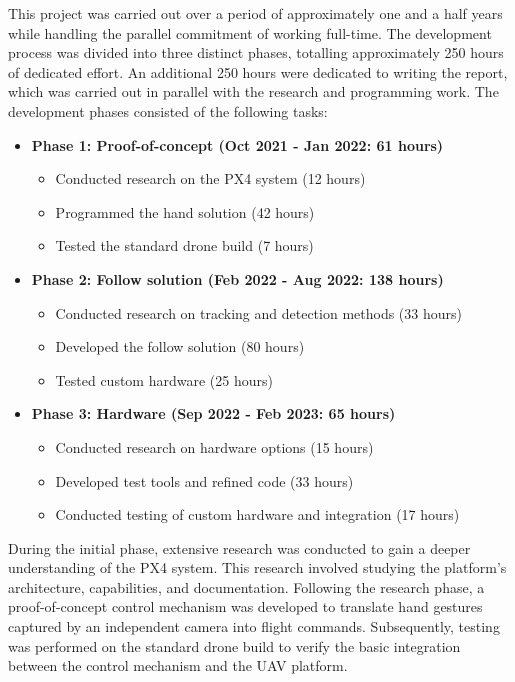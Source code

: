 This project was carried out over a period of approximately one and a half years while handling the parallel commitment of working full-time. The development process was divided into three distinct phases, totalling approximately 250 hours of dedicated effort. An additional 250 hours were dedicated to writing the report, which was carried out in parallel with the research and programming work. The development phases consisted of the following tasks:

\begin{itemize}
\item \textbf{Phase 1: Proof-of-concept (Oct 2021 - Jan 2022: 61 hours)}
\begin{itemize}
\item Conducted research on the PX4 system (12 hours)
\item Programmed the hand solution (42 hours)
\item Tested the standard drone build (7 hours)
\end{itemize}

\item \textbf{Phase 2: Follow solution (Feb 2022 - Aug 2022: 138 hours)}
\begin{itemize}
    \item Conducted research on tracking and detection methods (33 hours)
    \item Developed the follow solution (80 hours)
    \item Tested custom hardware (25 hours)
\end{itemize}

\item \textbf{Phase 3: Hardware (Sep 2022 - Feb 2023: 65 hours)}
\begin{itemize}
    \item Conducted research on hardware options (15 hours)
    \item Developed test tools and refined code (33 hours)
    \item Conducted testing of custom hardware and integration (17 hours)
\end{itemize}
\end{itemize}

During the initial phase, extensive research was conducted to gain a deeper understanding of the PX4 system. This research involved studying the platform's architecture, capabilities, and documentation. Following the research phase, a proof-of-concept control mechanism was developed to translate hand gestures captured by an independent camera into flight commands. Subsequently, testing was performed on the standard drone build to verify the basic integration between the control mechanism and the UAV platform.

